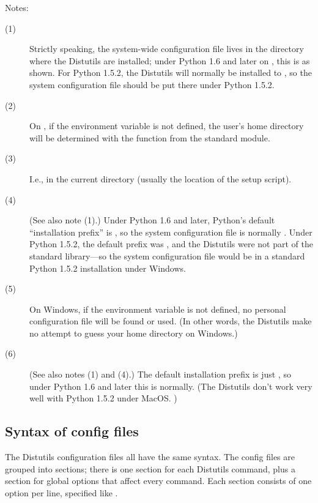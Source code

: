 \documentclass{howto}
\begin{document}
\noindent Notes:
\begin{description}
\item[(1)] Strictly speaking, the system-wide configuration file lives
  in the directory where the Distutils are installed; under Python 1.6
  and later on \UNIX, this is as shown. For Python 1.5.2, the Distutils
  will normally be installed to
  ,
  so the system configuration file should be put there under Python
  1.5.2.
\item[(2)] On \UNIX, if the  environment variable is not
  defined, the user's home directory will be determined with the
   function from the standard  module.
\item[(3)] I.e., in the current directory (usually the location of the
  setup script).
\item[(4)] (See also note (1).)  Under Python 1.6 and later, Python's
  default ``installation prefix'' is , so
  the system configuration file is normally
  .
  Under Python 1.5.2, the default prefix was
  , and the
  Distutils were not part of the standard library---so the system
  configuration file would be
  in a standard Python 1.5.2 installation under Windows.
\item[(5)] On Windows, if the  environment variable is not
  defined, no personal configuration file will be found or used.  (In
  other words, the Distutils make no attempt to guess your home
  directory on Windows.)
\item[(6)] (See also notes (1) and (4).)  The default installation
  prefix is just , so under Python 1.6 and later this is
  normally.  (The Distutils
  don't work very well with Python 1.5.2 under MacOS.  )
\end{description}


\subsection{Syntax of config files}
\label{config-syntax}

The Distutils configuration files all have the same syntax.  The config
files are grouped into sections; there is one section for each Distutils
command, plus a  section for global options that affect
every command.  Each section consists of one option per line, specified
like .
\end{document}
